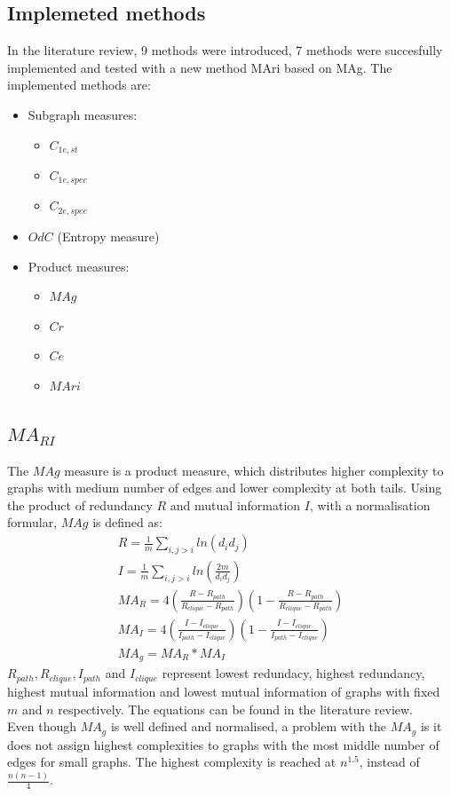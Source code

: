 \documentclass[12pt]{article}
\begin{document}
\subsection{Implemeted methods}
In the literature review, 9 methods were introduced, 7 methods were succesfully implemented and tested with a new method MAri based on MAg. The implemented methods are:
\begin{itemize}
    \item Subgraph measures:
    \begin{itemize}
        \item $C_{1e,st}$
        \item $C_{1e,spec}$
        \item $C_{2e,spec}$
    \end{itemize}
    \item $OdC$ (Entropy measure)
    \item Product measures:
    \begin{itemize}
        \item $MAg$
        \item $Cr$
        \item $Ce$
        \item $MAri$
    \end{itemize}
\end{itemize}

\subsection{$MA_{RI}$}
The $MAg$ measure is a product measure, which distributes higher complexity to graphs with medium number of edges and lower complexity at both tails. Using the product of redundancy $R$ and mutual information $I$, with a normalisation formular, $MAg$ is defined as\cite{KIM20082637}:
\begin{equation}
    \label{eq:MAg}
    \begin{gathered}
        R = \frac{1}{m}\sum_{i,j>i}ln(d_id_j)\\
        I = \frac{1}{m}\sum_{i,j>i}ln(\frac{2m}{d_id_j})\\
        MA_R = 4(\frac{R-R_{path}}{R_{clique}-R_{path}})(1-\frac{R-R_{path}}{R_{clique}-R_{path}})\\
        MA_I = 4(\frac{I-I_{clique}}{I_{path}-I_{clique}})(1-\frac{I-I_{clique}}{I_{path}-I_{clique}})\\
        MA_g = MA_R * MA_I
    \end{gathered}
\end{equation}
$R_{path},R_{clique},I_{path}$ and $I_{clique}$ represent lowest redundacy, highest redundancy, highest mutual information and lowest mutual information of graphs with fixed $m$ and $n$ respectively. The equations can be found in the literature review.\\
Even though $MA_g$ is well defined and normalised, a problem with the $MA_g$ is it does not assign highest complexities to graphs with the most middle number of edges for small graphs. The highest complexity is reached at $n^{1.5}$, instead of $\frac{n(n-1)}{4}$.\\
\end{document}
